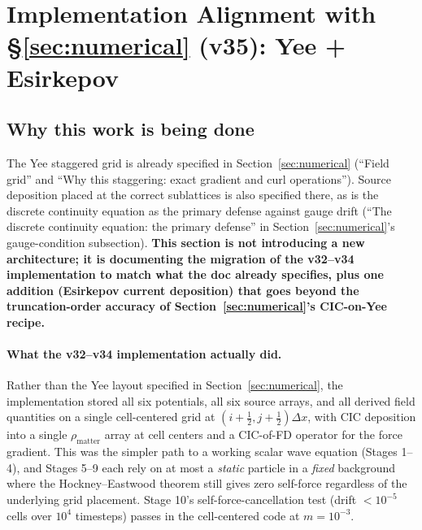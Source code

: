 \documentclass[11pt,a4paper]{article}
\begin{document}
\section{Implementation Alignment with §\ref{sec:numerical} (v35): Yee + Esirkepov}
\label{sec:yee_pivot}

\subsection{Why this work is being done}

The Yee staggered grid is already specified in
Section~\ref{sec:numerical} (``Field grid'' and ``Why this staggering:
exact gradient and curl operations'').  Source deposition placed at
the correct sublattices is also specified there, as is the discrete
continuity equation as the primary defense against gauge drift
(``The discrete continuity equation: the primary defense'' in
Section~\ref{sec:numerical}'s gauge-condition subsection).
\textbf{This section is not introducing a new architecture; it is
documenting the migration of the v32--v34 implementation to match
what the doc already specifies, plus one addition (Esirkepov current
deposition) that goes beyond the truncation-order accuracy of
Section~\ref{sec:numerical}'s CIC-on-Yee recipe.}

\paragraph{What the v32--v34 implementation actually did.}  Rather
than the Yee layout specified in Section~\ref{sec:numerical}, the
implementation stored all six potentials, all six source arrays, and
all derived field quantities on a single cell-centered grid at
$(i+\tfrac{1}{2}, j+\tfrac{1}{2})\Delta x$, with CIC deposition into a
single $\rho_{\mathrm{matter}}$ array at cell centers and a
CIC-of-FD operator for the force gradient.  This was the simpler
path to a working scalar wave equation (Stages 1--4), and Stages 5--9
each rely on at most a \emph{static} particle in a \emph{fixed}
background where the Hockney--Eastwood theorem still gives zero
self-force regardless of the underlying grid placement.  Stage 10's
self-force-cancellation test (drift $< 10^{-5}$ cells over $10^4$
timesteps) passes in the cell-centered code at $m = 10^{-3}$.
\end{document}
